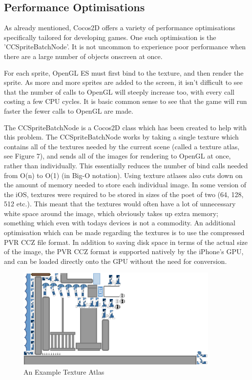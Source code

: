 \documentclass[a4paper,oneside]{report}
\begin{document}
\subsection{Performance Optimisations} 

As already mentioned, Cocos2D offers a variety of performance optimisations specifically tailored for developing games. One such optimisation is the 'CCSpriteBatchNode'. It is not uncommon to experience poor performance when there are a large number of objects onscreen at once. 

For each sprite, OpenGL ES must first bind to the texture, and then render the sprite. As more and more sprites are added to the screen, it isn't difficult to see that the number of calls to OpenGL will steeply increase too, with every call costing a few CPU cycles. It is basic common sense to see that the game will run faster the fewer calls to OpenGL are made. 

The CCSpriteBatchNode is a Cocos2D class which has been created to help with this problem. The CCSpriteBatchNode works by taking a single texture which contains all of the textures needed by the current scene (called a texture atlas, see Figure 7), and sends all of the images for rendering to OpenGL at once, rather than individually. This essentially reduces the number of bind calls needed from O(n) to O(1) (in Big-O notation). Using texture atlases also cuts down on the amount of memory needed to store each individual image. In some version of the iOS, textures were required to be stored in sizes of the poet of two (64, 128, 512 etc.). This meant that the textures would often have a lot of unnecessary white space around the image, which obviously takes up extra memory; something which even with todays devices is not a commodity. An additional optimisation which can be made regarding the textures is to use the compressed PVR CCZ file format. In addition to saving disk space in terms of the actual size of the image, the PVR CCZ format is supported natively by the iPhone's GPU, and can be loaded directly onto the GPU without the need for conversion.

\begin{figure}[h!]
  \centering
    \includegraphics[width=100mm]{sources/images/Texture_atlas}
    \caption{An Example Texture Atlas}
\end{figure}
\end{document}
